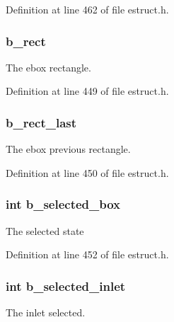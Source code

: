 Definition at line 462 of file estruct.\-h.

\hypertarget{struct__ebox_abc70ff46c135ee9f377a038bbc05a33e}{
\subsubsection[{b\-\_\-rect}]{ b\-\_\-rect}}\label{struct__ebox_abc70ff46c135ee9f377a038bbc05a33e}
The ebox rectangle. 

Definition at line 449 of file estruct.\-h.

\hypertarget{struct__ebox_a2a0a15d3bc005cd4f815088b230b5ebd}{
\subsubsection[{b\-\_\-rect\-\_\-last}]{ b\-\_\-rect\-\_\-last}}\label{struct__ebox_a2a0a15d3bc005cd4f815088b230b5ebd}
The ebox previous rectangle. 

Definition at line 450 of file estruct.\-h.

\hypertarget{struct__ebox_acc1a127070b19ccf6e222d7349c84c96}{
\subsubsection[{b\-\_\-selected\-\_\-box}]{\setlength{\rightskip}{0pt plus 5cm}int b\-\_\-selected\-\_\-box}}\label{struct__ebox_acc1a127070b19ccf6e222d7349c84c96}
The selected state 

Definition at line 452 of file estruct.\-h.

\hypertarget{struct__ebox_a0cebb4789c213079e0490e86c10c2893}{
\subsubsection[{b\-\_\-selected\-\_\-inlet}]{\setlength{\rightskip}{0pt plus 5cm}int b\-\_\-selected\-\_\-inlet}}\label{struct__ebox_a0cebb4789c213079e0490e86c10c2893}
The inlet selected. 

